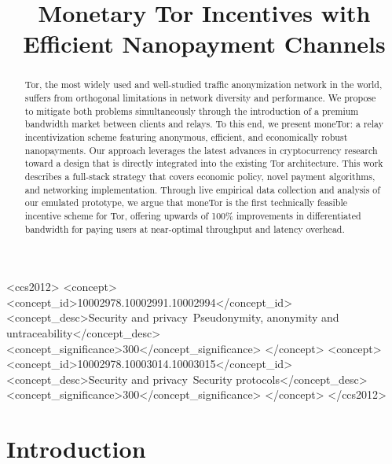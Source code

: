 \documentclass[sigconf, anonymous]{acmart}
\begin{document}
\title{Monetary Tor Incentives with Efficient Nanopayment Channels} %

\begin{abstract}

  Tor, the most widely used and well-studied traffic anonymization network in
  the world, suffers from orthogonal limitations in network diversity and
  performance. We propose to mitigate both problems simultaneously through the
  introduction of a premium bandwidth market between clients and relays. To this
  end, we present moneTor: a relay incentivization scheme featuring anonymous,
  efficient, and economically robust nanopayments. Our approach leverages the
  latest advances in cryptocurrency research toward a design that is directly
  integrated into the existing Tor architecture. This work describes a
  full-stack strategy that covers economic policy, novel payment algorithms, and
  networking implementation. Through live empirical data collection and analysis
  of our emulated prototype, we argue that moneTor is the first technically
  feasible incentive scheme for Tor, offering upwards of 100\% improvements in
  differentiated bandwidth for paying users at near-optimal throughput and
  latency overhead.

\end{abstract}

\begin{CCSXML}
<ccs2012>
<concept>
<concept_id>10002978.10002991.10002994</concept_id>
<concept_desc>Security and privacy~Pseudonymity, anonymity and untraceability</concept_desc>
<concept_significance>300</concept_significance>
</concept>
<concept>
<concept_id>10002978.10003014.10003015</concept_id>
<concept_desc>Security and privacy~Security protocols</concept_desc>
<concept_significance>300</concept_significance>
</concept>
</ccs2012>
\end{CCSXML}



\maketitle

\section{Introduction}
\label{sec:introduction}

\end{document}

